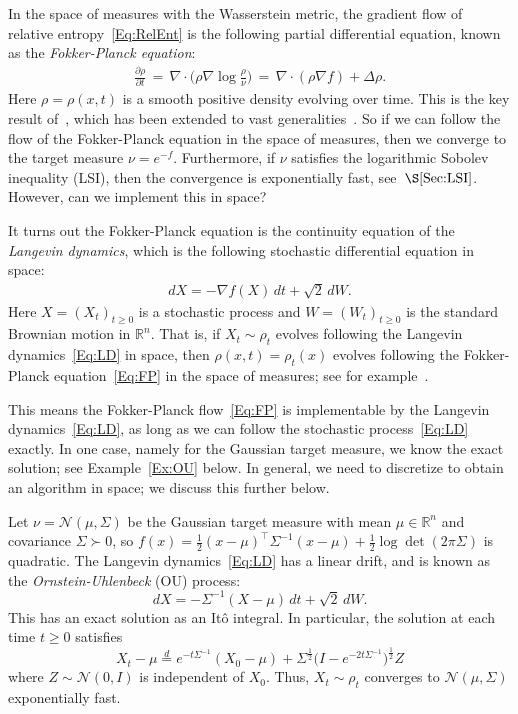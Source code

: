 \documentclass[final,12pt]{colt2018}
\newcommand{\R}{\mathbb{R}}
\newcommand{\N}{\mathcal{N}}
\renewcommand{\part}[2]{\frac{\partial #1}{\partial #2}}
\begin{document}
In the space of measures with the Wasserstein metric, the gradient flow of relative entropy~\eqref{Eq:RelEnt} is
the following partial differential equation, known as the {\em Fokker-Planck equation}: 
\begin{align}\label{Eq:FP}
\part{\rho}{t} \,=\, \nabla \cdot \Big( \rho \nabla \log \frac{\rho}{\nu}\Big) \,=\, \nabla \cdot (\rho \nabla f) + \Delta \rho.
\end{align}
Here $\rho = \rho(x,t)$ is a smooth positive density evolving over time. 
This is the key result of~\cite{JKO98}, which has been extended to vast generalities~\citep{Vil08}.
So if we can follow the flow of the Fokker-Planck equation in the space of measures, then we converge to the target measure $\nu = e^{-f}$.
Furthermore, if $\nu$ satisfies the logarithmic Sobolev inequality (LSI), then the convergence is exponentially fast, see~$\S\ref{Sec:LSI}$.
However, can we implement this in space?

It turns out the Fokker-Planck equation is the continuity equation 
of the {\em Langevin dynamics}, which is the following stochastic differential equation in space:
\begin{align}\label{Eq:LD}
dX = -\nabla f(X) \, dt + \sqrt{2} \, dW.
\end{align}
Here $X = (X_t)_{t \ge 0}$ is a stochastic process and $W = (W_t)_{t \ge 0}$ is the standard Brownian motion in $\R^n$. 
That is, if $X_t \sim \rho_t$ evolves following the Langevin dynamics~\eqref{Eq:LD} in space, then $\rho(x,t) = \rho_t(x)$ evolves following the Fokker-Planck equation~\eqref{Eq:FP} in the space of measures; see for example~\cite[$\S11$]{Mac92}.

This means the Fokker-Planck flow~\eqref{Eq:FP} is implementable by the Langevin dynamics~\eqref{Eq:LD}, as long as we can follow the stochastic process~\eqref{Eq:LD} exactly.
In one case, namely for the Gaussian target measure, we know the exact solution; see Example~\ref{Ex:OU} below.
In general, we need to discretize to obtain an algorithm in space;
we discuss this further below.


\begin{example}\label{Ex:OU}
Let $\nu = \N(\mu,\Sigma)$ be the Gaussian target measure with mean $\mu \in \R^n$ and covariance $\Sigma \succ 0$, so $f(x) = \frac{1}{2}(x-\mu)^\top \Sigma^{-1} (x-\mu) + \frac{1}{2} \log \det(2\pi\Sigma)$ is quadratic.
The Langevin dynamics~\eqref{Eq:LD} has a linear drift, and is known as the {\em Ornstein-Uhlenbeck} (OU) process:
$$dX = -\Sigma^{-1}(X-\mu) \, dt + \sqrt{2} \, dW.$$
This has an exact solution as an It\^o integral.
In particular, the solution at each time $t \ge 0$ satisfies
$$X_t-\mu \stackrel{d}{=} e^{-t \Sigma^{-1}} (X_0-\mu) + \Sigma^{\frac{1}{2}} \Big(I-e^{-2t\Sigma^{-1}}\Big)^{\frac{1}{2}} Z$$
where $Z \sim \N(0,I)$ is independent of $X_0$.
Thus, $X_t \sim \rho_t$ converges to $\N(\mu,\Sigma)$ exponentially fast.
\end{example}
\end{document}
